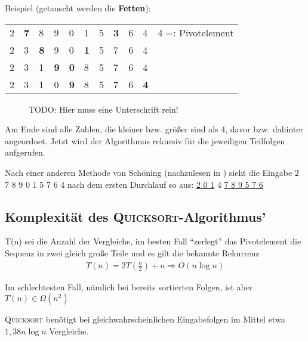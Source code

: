 Beispiel (getauscht werden die \textbf{Fetten}):

\begin{tabular}{lllllllllll}
2 & \textbf{7} & 8 & 9 & 0 & 1 & 5 & \textbf{3} & 6 & 4 & \hspace{15pt} 4 =: Pivotelement\\
2 & 3 & \textbf{8} & 9 & 0 & \textbf{1} & 5 & 7 & 6 & 4 &\\ 
2 & 3 & 1 & \textbf{9} & \textbf{0} & 8 & 5 & 7 & 6 & 4 &\\
2 & 3 & 1 & 0 & \textbf{9} & 8 & 5 & 7 & 6 & \textbf{4} &\\
\end{tabular}

%
\begin{figure}[H]
  \centering
  
\caption{TODO: Hier muss eine Unterschrift rein!}
  \label{031103a}
\end{figure}

Am Ende sind alle Zahlen, die kleiner bzw. größer sind als 4, davor bzw. dahinter angeordnet. 
Jetzt wird der Algorithmus rekursiv für die jeweiligen Teilfolgen aufgerufen.

Nach einer anderen Methode von Schöning (nachzulesen in \cite{sedgewick}) sieht die Eingabe 2 7 8 9 0 1 5 7 6 4 nach dem ersten Durchlauf so aus: 
\underline{2 0 1} 4 \underline{7 8 9 5 7 6}

\subsection{Komplexität des \textsc{Quicksort}-Algorithmus'}

T(n) sei die Anzahl der Vergleiche, im besten Fall "`zerlegt"' das Pivotelement die Sequenz in zwei gleich große Teile und es gilt die
bekannte Rekurrenz
\begin{gather*}
T(n)=2T\left(\frac{n}{2}\right)+n \Rightarrow O(n \log n)
\end{gather*}

Im schlechtesten Fall, nämlich bei bereits sortierten Folgen, ist aber \(T(n) \in \Omega(n^2)\) 

\begin{satz}
\textsc{Quicksort} benötigt bei gleichwahrscheinlichen Eingabefolgen im Mittel etwa $1,38 n \log n$ Vergleiche.
\end{satz}

